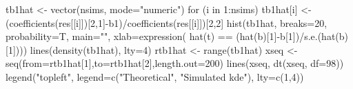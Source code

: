 \begin{Schunk}
\begin{Sinput}
 tb1hat <- vector(nsims, mode="numeric")
 for (i in 1:nsims){ tb1hat[i] <- (coefficients(res[[i]])[2,1]-b1)/coefficients(res[[i]])[2,2]}
 hist(tb1hat, breaks=20, probability=T, main="", xlab=expression( hat(t) == (hat(b)[1]-b[1])/s.e.(hat(b)[1])))
 lines(density(tb1hat), lty=4)
 rtb1hat <- range(tb1hat)
 xseq <- seq(from=rtb1hat[1],to=rtb1hat[2],length.out=200)
 lines(xseq, dt(xseq, df=98))
 legend("topleft", legend=c("Theoretical", "Simulated kde"), lty=c(1,4))
\end{Sinput}
\end{Schunk}
